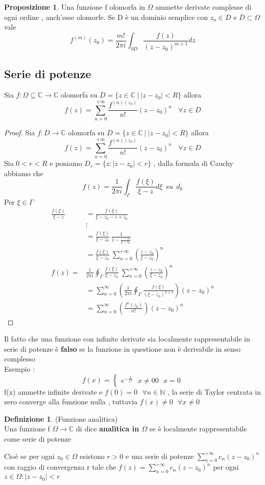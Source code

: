 \documentclass{article}
\theoremstyle{definition}
\newtheorem*{definizione}{Definizione}
\newtheorem*{proposizione}{Proposizione}
\newcommand{\C}{\mathbb{C}}
\newcommand{\norm}[1]{|#1|}
\begin{document}
	\begin{proposizione}
		Una funzione f  olomorfa in $\Omega$ ammette derivate complesse di ogni ordine , anch'esse olomorfe. Se D è un dominio semplice con $z_o \in D$ e $\overline{D}\subset \Omega$ vale 
		$$f^{(m)}(z_0)=\frac{m!}{2 \pi i } \int_{\partial D}\frac{f(z)}{(z-z_0)^{m+1}}dz$$
 	\end{proposizione} 
 	\subsection{Serie di potenze}
	\begin{teo}{}{}
		Sia $f:\Omega \subseteq \C \rightarrow \C $ olomorfa su $D=\{z \in \C \ |\  \norm{z-z_0}<R\} $ allora 
		$$f(z)=\sum_{n=0}^{+\infty}\frac{f^{(n)(z_0)}}{n!}(z-z_0)^n \ \ \ \ \forall z \in D$$
	\end{teo}
	\begin{proof}
		Sia $f:D\rightarrow \C $ olomorfa su $D=\{z \in \C \ |\  \norm{z-z_0}<R\} $  allora 
	$$f(z)=\sum_{n=0}^{+\infty}\frac{f^{(n)(z_0)}}{n!}(z-z_0)^n \ \ \ \ \forall z \in D$$
	Sia $0<r<R$ e poniamo $D_r=\{z:\norm{z-z_0}<r\}$ , dalla formula di Cauchy abbiamo che 
$$f(z)=\frac{1}{2 \pi i } \int_{\Gamma} \frac{f(\xi)}{\xi-z}d\xi \ \ su \ \ d_k$$
Per $\xi \in \Gamma$ 
\begin{align*}
	\frac{f(\xi)}{\xi-z}&=\frac{f(\xi)}{\xi-z_0-z+z_0}\\
	&\vdots \\
	&=\frac{f(\xi)}{\xi-z_0} \ \frac{1}{1-\frac{z-z_0}{\xi-z_0}} \\
	&=\frac{f(\xi)}{\xi-z_0}  \ \sum_{n=0}^{+\infty}\left(\frac{z-z_0}{\xi-z_0} \right)^n \\
	f(z)=&\frac{1}{2 \pi i}\oint_{\Gamma}\frac{f(\xi)}{\xi-z_0}  \ \sum_{n=0}^{+\infty}\left(\frac{z-z_0}{\xi-z_0} \right)^n \\
	&=\sum_{n=0}^{\infty}\left(\frac{1}{2\pi i}\oint_{\Gamma}\frac{f(\xi)}{(\xi-z_0)^{n+1}}  \right)(z-z_0)^n\\
	&=\sum_{n=0}^{\infty}\left(\frac{f^{n}(z_0)}{n!}\right)(z-z_0)^n
\end{align*}
	\end{proof}
	Il fatto che una funzione con infinite derivate sia localmente rappresentabile in serie di potenze è \textbf{falso} se la funzione in questione non è derivabile in senso complesso \\
	Esempio : $$f(x)= \begin{cases}
		e^{-\frac{1}{x^2}} \ \ \ x \neq 0
		0 \ \ \ x=0 
	\end{cases} $$ f(x) ammette infinite derivate e $f(0)=0\ \ \ \forall n \in \mathbb{N}$ , la serie di Taylor centrata in zero converge alla funzione nulla , tuttavia $f(x)\neq 0 \ \ \ \forall x \neq 0$   
	\begin{definizione}(Funzione analitica)\\
		Una funzione f $\Omega \rightarrow \C$ di dice \textbf{analitica in $\Omega$} se è localmente rappresentabile come serie di potenze
	\end{definizione}
	Cioè se per ogni $z_0 \in \Omega$ esistono $r>0$ e una serie di potenze $\sum_{n=0}^{+\infty}c_n(z-z_0)^n$ con raggio di convergenza r tale che $f(z)= \sum_{n=0}^{+\infty}c_n(z-z_0)^n$ per ogni $z \in \Omega : \norm{z-z_0}<r$
\end{document}
